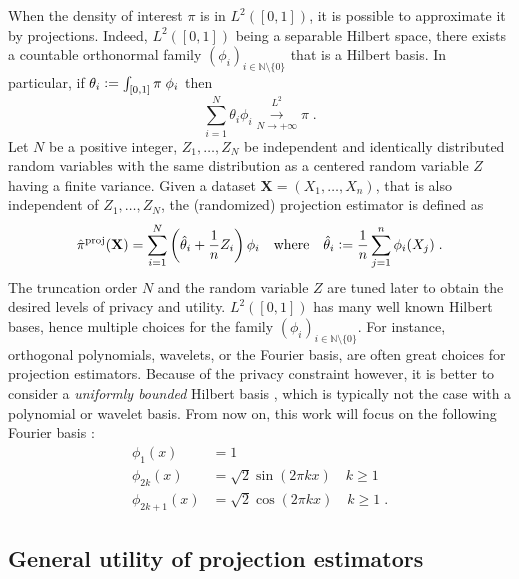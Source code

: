 \documentclass[10pt]{article} %
\newcommand{\N}[0]{\mathbb{N}}
\newcommand{\eqdef}{\vcentcolon=}
\newcommand\vect[1]{\mathbf{#1}}
\newcommand\conv[1]{\overset{}{\underset{#1}{\longrightarrow}}}
\newcommand\p[1]{\left( {#1}\right)}
\newcommand\RG[1]{\textcolor{red}{#1}}
\newcommand\mRG[1]{\marginpar{\tiny\RG{#1}}}
\begin{document}
When the density of interest $\pi$ is in $L^2([0, 1])$, it is possible to approximate it by projections. Indeed, $L^2([0, 1])$ being a separable Hilbert space, there exists a countable orthonormal family $\p{\phi_i}_{i \in \N \setminus \{0\}}$ that is a Hilbert basis. In particular, if $\theta_i \eqdef \int_{[0, 1]} \pi\;\phi_i $ then
\begin{equation*}
    \sum_{i=1}^N \theta_i \phi_i \stackrel{L^2}{\conv{N \rightarrow +\infty}} \pi \;.
\end{equation*}
Let $N$ be a positive integer, $Z_1, \dots, Z_{N}$ be independent and identically distributed random variables with the same distribution as a centered random variable $Z$ having a finite variance. Given a dataset $\vect{X} = (X_1, \dots, X_n)$, that is also independent of $Z_1, \dots, Z_{N}$, the (randomized) projection estimator is defined as 
\begin{equation}
\label{def:projestimator}
    \hat{\pi}^{\text{proj}} (\vect{X}) = \sum_{i=1}^N \p{\hat{\theta}_i + \frac{1}{n} Z_i} \phi_i \quad \text{where} \quad \hat{\theta}_i \eqdef \frac{1}{n} \sum_{j=1}^n \phi_i(X_j)  \;.
\end{equation}%
The truncation order $N$ and the random variable $Z$ are tuned later to obtain the desired levels of privacy and utility.
$L^2([0, 1])$ has many well known Hilbert bases, hence multiple choices for the family $\p{\phi_i}_{i \in \N \setminus \{0\}}$. For instance, orthogonal polynomials, wavelets, or the Fourier basis, are often great choices for projection estimators. Because of the privacy constraint however, it is better to consider a \emph{uniformly bounded} Hilbert basis \citep{wasserman2010statistical}, which is typically not the case with a polynomial or wavelet basis. From now on, this work will focus on the following Fourier basis : 
\begin{equation*}
    \begin{aligned}
        \phi_1(x) &= 1 \\
        \phi_{2k}(x) &= \sqrt{2} \sin \p{2 \pi k x} \quad k \geq 1 \\
        \phi_{2k + 1}(x) &= \sqrt{2} \cos \p{2 \pi k x} \quad k \geq 1 \;.
    \end{aligned}
\end{equation*}

\subsection{General utility of projection estimators}
\end{document}
